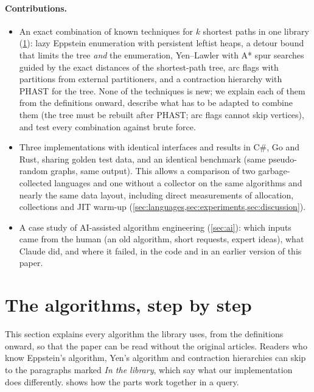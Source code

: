 \documentclass[11pt,a4paper]{article}
\newcommand{\cs}{C\#}
\begin{document}
\paragraph{Contributions.}
\begin{itemize}
  \item An exact combination of known techniques for $k$ shortest paths in one library (\cref{sec:algorithms}): lazy
        Eppstein enumeration with persistent leftist heaps, a detour bound that limits the tree \emph{and} the
        enumeration, Yen--Lawler with A* spur searches guided by the exact distances of the shortest-path tree, arc
        flags with partitions from external partitioners, and a contraction hierarchy with PHAST for the tree. None
        of the techniques is new; we explain each of them from the definitions onward, describe what has to be
        adapted to combine them (the tree must be rebuilt after PHAST; arc flags cannot skip vertices), and test
        every combination against brute force.
  \item Three implementations with identical interfaces and results in \cs, Go and Rust, sharing golden test data,
        and an identical benchmark (same pseudo-random graphs, same output). This allows a comparison of two
        garbage-collected languages and one without a collector on the same algorithms and nearly the same data
        layout, including direct measurements of allocation, collections and JIT warm-up
        (\cref{sec:languages,sec:experiments,sec:discussion}).
  \item A case study of AI-assisted algorithm engineering (\cref{sec:ai}): which inputs came from the human (an old
        algorithm, short requests, expert ideas), what Claude did, and where it failed, in the code and in an
        earlier version of this paper.
\end{itemize}

\section{The algorithms, step by step}\label{sec:algorithms}

This section explains every algorithm the library uses, from the definitions onward, so that the paper can be read
without the original articles. Readers who know Eppstein's algorithm, Yen's algorithm and contraction hierarchies can
skip to the paragraphs marked \emph{In the library}, which say what our implementation does differently.
 shows how the parts work together in a query.
\end{document}
